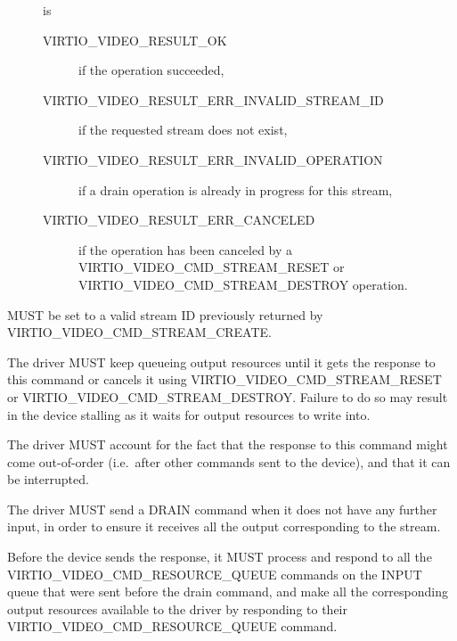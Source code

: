 \begin{description}
\item[]
is

\begin{description}
\item[VIRTIO_VIDEO_RESULT_OK]
if the operation succeeded,
\item[VIRTIO_VIDEO_RESULT_ERR_INVALID_STREAM_ID]
if the requested stream does not exist,
\item[VIRTIO_VIDEO_RESULT_ERR_INVALID_OPERATION]
if a drain operation is already in progress for this stream,
\item[VIRTIO_VIDEO_RESULT_ERR_CANCELED]
if the operation has been canceled by a
VIRTIO_VIDEO_CMD_STREAM_RESET or VIRTIO_VIDEO_CMD_STREAM_DESTROY
operation.
\end{description}
\end{description}


 MUST be set to a valid stream ID previously returned
by VIRTIO_VIDEO_CMD_STREAM_CREATE.

The driver MUST keep queueing output resources until it gets the
response to this command or cancels it using
VIRTIO_VIDEO_CMD_STREAM_RESET or
VIRTIO_VIDEO_CMD_STREAM_DESTROY. Failure to do so may result in the
device stalling as it waits for output resources to write into.

The driver MUST account for the fact that the response to this command
might come out-of-order (i.e.~after other commands sent to the device),
and that it can be interrupted.

The driver MUST send a DRAIN command when it does not have any further
input, in order to ensure it receives all the output corresponding to
the stream.


Before the device sends the response, it MUST process and respond to all
the VIRTIO_VIDEO_CMD_RESOURCE_QUEUE commands on the INPUT queue that
were sent before the drain command, and make all the corresponding
output resources available to the driver by responding to their
VIRTIO_VIDEO_CMD_RESOURCE_QUEUE command.

